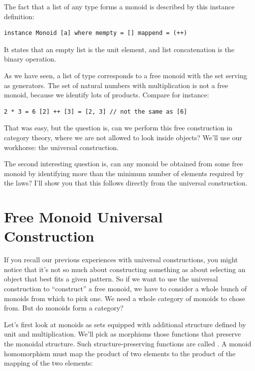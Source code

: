 The fact that a list of any type forms a monoid is described by this
instance definition:

\begin{verbatim}
instance Monoid [a] where mempty = [] mappend = (++)
\end{verbatim}

It states that an empty list \code{{[}{]}} is the unit element, and
list concatenation \code{(++)} is the binary operation.

As we have seen, a list of type  corresponds to a free monoid
with the set  serving as generators. The set of natural
numbers with multiplication is not a free monoid, because we identify
lots of products. Compare for instance:

\begin{verbatim}
2 * 3 = 6 [2] ++ [3] = [2, 3] // not the same as [6]
\end{verbatim}

That was easy, but the question is, can we perform this free
construction in category theory, where we are not allowed to look inside
objects? We'll use our workhorse: the universal construction.

The second interesting question is, can any monoid be obtained from some
free monoid by identifying more than the minimum number of elements
required by the laws? I'll show you that this follows directly from the
universal construction.

\section{Free Monoid Universal
Construction}\label{free-monoid-universal-construction}

If you recall our previous experiences with universal constructions, you
might notice that it's not so much about constructing something as about
selecting an object that best fits a given pattern. So if we want to use
the universal construction to ``construct'' a free monoid, we have to
consider a whole bunch of monoids from which to pick one. We need a
whole category of monoids to chose from. But do monoids form a category?

Let's first look at monoids as sets equipped with additional structure
defined by unit and multiplication. We'll pick as morphisms those
functions that preserve the monoidal structure. Such
structure-preserving functions are called . A monoid
homomorphism must map the product of two elements to the product of the
mapping of the two elements:

